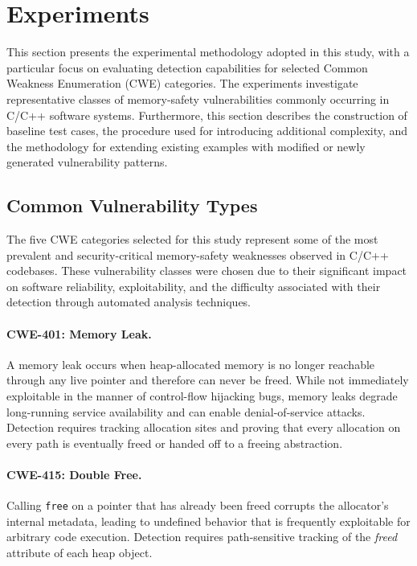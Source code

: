 \documentclass[11pt,a4paper]{article}
\begin{document}
\section{Experiments}

This section presents the experimental methodology adopted in this study, with a particular focus on evaluating detection capabilities for selected Common Weakness Enumeration (CWE) categories. The experiments investigate representative classes of memory-safety vulnerabilities commonly occurring in C/C++ software systems. Furthermore, this section describes the construction of baseline test cases, the procedure used for introducing additional complexity, and the methodology for extending existing examples with modified or newly generated vulnerability patterns.

\subsection{Common Vulnerability Types}

The five CWE categories selected for this study represent some of the most prevalent and security-critical memory-safety weaknesses observed in C/C++ codebases. These vulnerability classes were chosen due to their significant impact on software reliability, exploitability, and the difficulty associated with their detection through automated analysis techniques.

\paragraph{CWE-401: Memory Leak.} A memory leak occurs when heap-allocated memory is no longer reachable through any live pointer and therefore can never be freed. While not immediately exploitable in the manner of control-flow hijacking bugs, memory leaks degrade long-running service availability and can enable denial-of-service attacks. Detection requires tracking allocation sites and proving that every allocation on every path is eventually freed or handed off to a freeing abstraction.

\paragraph{CWE-415: Double Free.} Calling \texttt{free} on a pointer that has already been freed corrupts the allocator's internal metadata, leading to undefined behavior that is frequently exploitable for arbitrary code execution. Detection requires path-sensitive tracking of the \emph{freed} attribute of each heap object.
\end{document}
